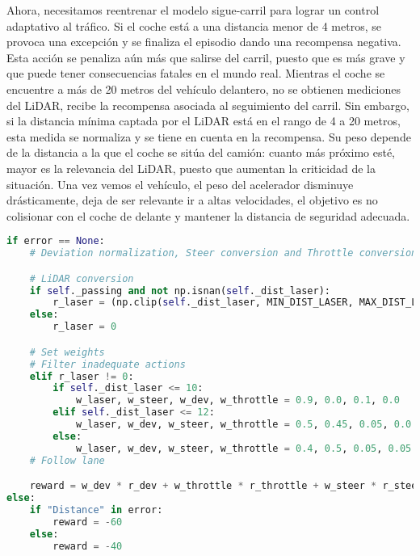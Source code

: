 Ahora, necesitamos reentrenar el modelo sigue-carril para lograr un control adaptativo al tráfico. Si el coche está a una distancia menor de 4 metros, se provoca una excepción y se finaliza el episodio dando una recompensa negativa. Esta acción se penaliza aún más que salirse del carril, puesto que es más grave y que puede tener consecuencias fatales en el mundo real. Mientras el coche se encuentre a más de 20 metros del vehículo delantero, no se obtienen mediciones del \ac{LiDAR}, recibe la recompensa asociada al seguimiento del carril. Sin embargo, si la distancia mínima captada por el \ac{LiDAR} está en el rango de 4 a 20 metros, esta medida se normaliza y se tiene en cuenta en la recompensa. Su peso depende de la distancia a la que el coche se sitúa del camión: cuanto más próximo esté, mayor es la relevancia del \ac{LiDAR}, puesto que aumentan la criticidad de la situación. Una vez vemos el vehículo, el peso del acelerador disminuye drásticamente, deja de ser relevante ir a altas velocidades, el objetivo es no colisionar con el coche de delante y mantener la distancia de seguridad adecuada.

\begin{code}[H]
\begin{lstlisting}[language=Python]
if error == None:
    # Deviation normalization, Steer conversion and Throttle conversion

    # LiDAR conversion
    if self._passing and not np.isnan(self._dist_laser):
        r_laser = (np.clip(self._dist_laser, MIN_DIST_LASER, MAX_DIST_LASER) - MIN_DIST_LASER) / (MAX_DIST_LASER - MIN_DIST_LASER)       
    else:
        r_laser = 0

    # Set weights
    # Filter inadequate actions
    elif r_laser != 0:
        if self._dist_laser <= 10:
            w_laser, w_steer, w_dev, w_throttle = 0.9, 0.0, 0.1, 0.0
        elif self._dist_laser <= 12:
            w_laser, w_dev, w_steer, w_throttle = 0.5, 0.45, 0.05, 0.0
        else:
            w_laser, w_dev, w_steer, w_throttle = 0.4, 0.5, 0.05, 0.05
    # Follow lane

    reward = w_dev * r_dev + w_throttle * r_throttle + w_steer * r_steer + w_laser * r_laser
else:
    if "Distance" in error:
        reward = -60
    else:
        reward = -40
\end{lstlisting}
\caption[Función de recompensa respecto al \ac{LiDAR} para control adaptativo con \ac{PPO}]{Función de recompensa respecto al \ac{LiDAR} para control adaptativo con \ac{PPO}.}
\label{cod:rew_ppo_passing}
\end{code}


